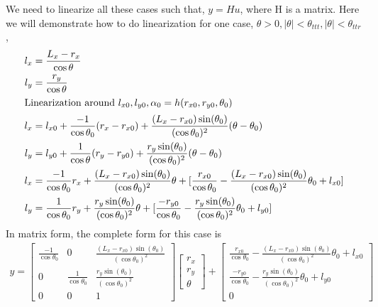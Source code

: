 \documentclass[12pt, letterpaper]{amsart} %
\numberwithin{equation}{section}
\begin{document}
\\
\\
We need to linearize all these cases such that, $y = H u$, where H is a matrix. Here we will demonstrate how to do linearization for one case, $\theta >0, |\theta| < \theta_{ttt}, |\theta| < \theta_{ttr}$,
\begin{align*}
  l_x &= \frac{L_x - r_x}{\cos \theta} \\
  l_y &= \frac{r_y}{\cos \theta} \\
  \intertext{Linearization around $l_{x0}, l_{y0}, \alpha_{0} = h(r_{x0}, r_{y0}, \theta_0)$}
  l_x &= l_{x0} + \frac{-1}{\cos \theta_0} (r_x - r_{x0}) + \frac{(L_x - r_{x0})\sin(\theta_0)}{(\cos{\theta_0})^2} (\theta - \theta_0) \\
  l_y &= l_{y0} + \frac{1}{\cos \theta}(r_y - r_{y0}) + \frac{r_y \sin(\theta_0)}{(\cos \theta_0)^2} (\theta - \theta_0) \\
  l_x &= \frac{-1}{\cos \theta_0} r_x + \frac{(L_x - r_{x0})\sin(\theta_0)}{(\cos{\theta_0})^2} \theta + [\frac{r_{x0}}{\cos \theta_0} - \frac{(L_x - r_{x0})\sin(\theta_0)}{(\cos{\theta_0})^2}\theta_0 + l_{x0}] \\
  l_y &= \frac{1}{\cos \theta_0}r_y + \frac{r_y \sin(\theta_0)}{(\cos \theta_0)^2} \theta + [\frac{-r_{y0}}{\cos \theta_0} - \frac{r_y \sin(\theta_0)}{(\cos \theta_0)^2} \theta_0 + l_{y0}]
\end{align*}
In matrix form, the complete form for this case is
\begin{align*}
  y =
  \begin{bmatrix}
    \frac{-1}{\cos \theta_0} & 0 & \frac{(L_x - r_{x0})\sin(\theta_0)}{(\cos{\theta_0})^2} \\
    0 & \frac{1}{\cos \theta_0} & \frac{r_y \sin(\theta_0)}{(\cos \theta_0)^2} \\
    0 & 0 & 1
  \end{bmatrix}
            \begin{bmatrix}
              r_x \\
              r_y \\
              \theta
            \end{bmatrix}
            +
            \begin{bmatrix}
              \frac{r_{x0}}{\cos \theta_0} - \frac{(L_x - r_{x0})\sin(\theta_0)}{(\cos{\theta_0})^2}\theta_0 + l_{x0} \\
              \frac{-r_{y0}}{\cos \theta_0} - \frac{r_y \sin(\theta_0)}{(\cos \theta_0)^2} \theta_0 + l_{y0} \\
              0
            \end{bmatrix}
\end{align*}
\end{document}
